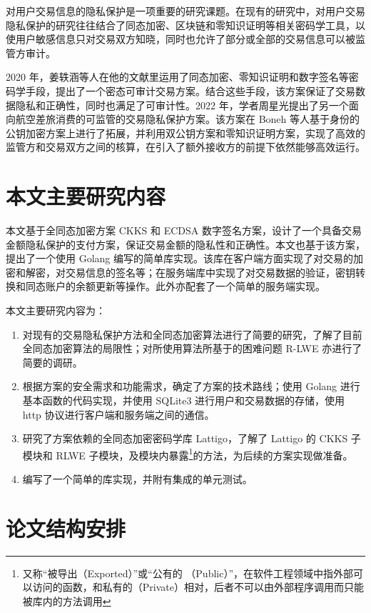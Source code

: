 对用户交易信息的隐私保护是一项重要的研究课题。在现有的研究中，对用户交易隐私保护的研究往往结合了同态加密、区块链和零知识证明等相关密码学工具，以使用户敏感信息只对交易双方知晓，同时也允许了部分或全部的交易信息可以被监管方审计。

2020 年，姜轶涵等人在他的文献里\cite{ACT}运用了同态加密、零知识证明和数字签名等密码学手段，提出了一个密态可审计交易方案。结合这些手段，该方案保证了交易数据隐私和正确性，同时也满足了可审计性。2022 年，学者周星光提出了另一个面向航空差旅消费的可监管的交易隐私保护方案。\cite{ZXG_Air_privacy}该方案在 Boneh 等人基于身份的公钥加密方案上进行了拓展，并利用双公钥方案和零知识证明方案，实现了高效的监管方和交易双方之间的核算，在引入了额外接收方的前提下依然能够高效运行。

\section{本文主要研究内容}

本文基于全同态加密方案 CKKS\cite{cryptoeprint:2016/421} 和 ECDSA 数字签名方案，设计了一个具备交易金额隐私保护的支付方案，保证交易金额的隐私性和正确性。本文也基于该方案，提出了一个使用 Golang 编写的简单库实现。该库在客户端方面实现了对交易的加密和解密，对交易信息的签名等；在服务端库中实现了对交易数据的验证，密钥转换和同态账户的余额更新等操作。此外亦配套了一个简单的服务端实现。

本文主要研究内容为：

\begin{enumerate}
    \item 对现有的交易隐私保护方法和全同态加密算法进行了简要的研究，了解了目前全同态加密算法的局限性；对所使用算法所基于的困难问题 R-LWE 亦进行了简要的调研。
    \item 根据方案的安全需求和功能需求，确定了方案的技术路线；使用 Golang 进行基本函数的代码实现，并使用 SQLite3 进行用户和交易数据的存储，使用 http 协议进行客户端和服务端之间的通信。
    \item 研究了方案依赖的全同态加密密码学库 Lattigo\cite{lattigoRepo}，了解了 Lattigo 的 CKKS 子模块和 RLWE 子模块，及模块内暴露\footnote{又称“被导出（Exported）”或“公有的 （Public）”，在软件工程领域中指外部可以访问的函数，和私有的（Private）相对，后者不可以由外部程序调用而只能被库内的方法调用}的方法，为后续的方案实现做准备。
    \item 编写了一个简单的库实现，并附有集成的单元测试。
\end{enumerate}

\section{论文结构安排}

